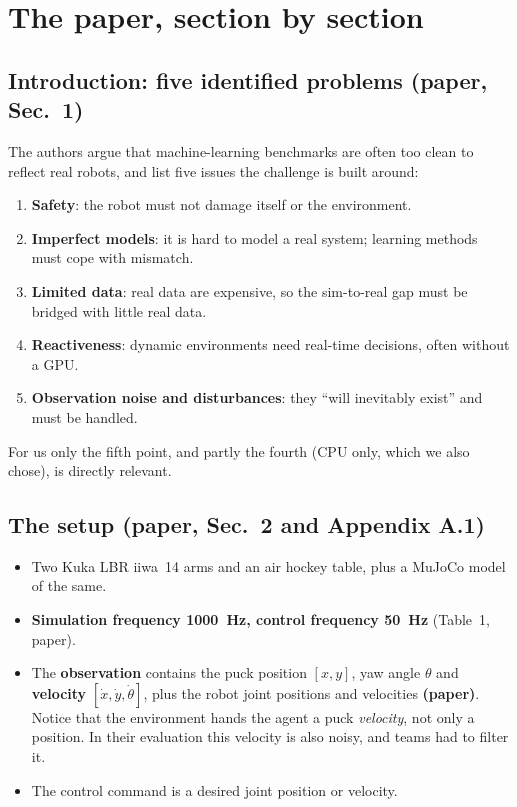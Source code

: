 \documentclass[11pt,a4paper]{article}
\begin{document}
\section{The paper, section by section}

\subsection{Introduction: five identified problems (paper, Sec.~1)}
The authors argue that machine-learning benchmarks are often too clean to reflect real robots,
and list five issues the challenge is built around:
\begin{enumerate}
\item \textbf{Safety}: the robot must not damage itself or the environment.
\item \textbf{Imperfect models}: it is hard to model a real system; learning methods must cope
with mismatch.
\item \textbf{Limited data}: real data are expensive, so the sim-to-real gap must be bridged with
little real data.
\item \textbf{Reactiveness}: dynamic environments need real-time decisions, often without a GPU.
\item \textbf{Observation noise and disturbances}: they ``will inevitably exist'' and
must be handled.
\end{enumerate}
For us only the fifth point, and partly the fourth (CPU only, which we also chose), is directly
relevant.

\subsection{The setup (paper, Sec.~2 and Appendix A.1)}
\begin{itemize}
\item Two Kuka LBR iiwa~14 arms and an air hockey table, plus a MuJoCo model of the same.
\item \textbf{Simulation frequency 1000~Hz, control frequency 50~Hz} (Table~1, paper).
\item The \textbf{observation} contains the puck position $[x,y]$, yaw angle $\theta$ and
\textbf{velocity} $[\dot x,\dot y,\dot\theta]$, plus the robot joint positions and velocities
\textbf{(paper)}. Notice that the environment hands the agent a puck \emph{velocity}, not only a
position. In their evaluation this velocity is also noisy, and teams had to filter it.
\item The control command is a desired joint position or velocity.
\end{itemize}
\end{document}

